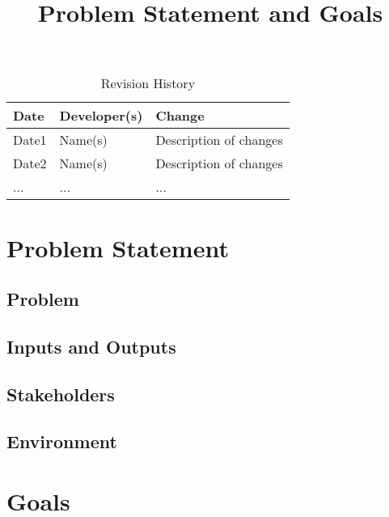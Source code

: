 \documentclass{article}
\title{Problem Statement and Goals\\\progname}
\author{\authname}
\date{}
\begin{document}
    \maketitle

    \begin{table}[hp]
        \caption{Revision History} \label{TblRevisionHistory}
        \begin{tabularx}{\textwidth}{llX}
            \toprule
            \textbf{Date} & \textbf{Developer(s)} & \textbf{Change}\\
            \midrule
            Date1 & Name(s) & Description of changes\\
            Date2 & Name(s) & Description of changes\\
            ... & ... & ...\\
            \bottomrule
        \end{tabularx}
    \end{table}

    \section{Problem Statement}

    \subsection{Problem}

    \subsection{Inputs and Outputs}

    \subsection{Stakeholders}

    \subsection{Environment}

    \section{Goals}
\end{document}
